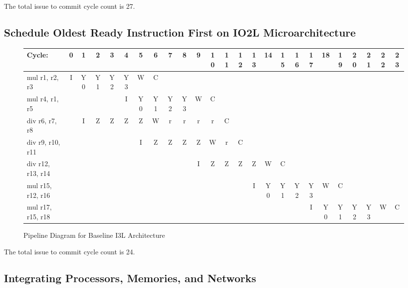 \documentclass[10pt]{article}
\begin{document}
The total issue to commit cycle count is 27.

\subsection{Schedule Oldest Ready Instruction First on IO2L Microarchitecture}

\begin{figure}[H]
\centering
{\setlength{\tabcolsep}{2pt}
\begin{tabular}{|l!{\vrule width 1.5pt}c|c|c|c|c|c|c|c|c|c|c|c|c|c|c|c|c|c|c|c|c|c|c|c!{\vrule width 1.5pt}}
\hline
Cycle:            & 0 & 1 & 2 & 3 & 4 & 5 & 6 & 7 & 8 & 9 & 10 & 11 & 12 & 13 & 14 & 15 & 16 & 17 & 18 & 19 & 20 & 21 & 22 & 23 \\ \hline
mul r1, r2, r3    & I & Y0& Y1& Y2& Y3& W & C &   &   &   &    &    &    &    &    &    &    &    &    &    &    &    &    &    \\ \hline
mul r4, r1, r5    &   &   &   &   & I & Y0& Y1& Y2& Y3& W & C  &    &    &    &    &    &    &    &    &    &    &    &    &    \\ \hline
div r6, r7, r8    &   & I & Z & Z & Z & Z & W & r & r & r & r  & C  &    &    &    &    &    &    &    &    &    &    &    &    \\ \hline
div r9, r10, r11  &   &   &   &   &   & I & Z & Z & Z & Z & W  & r  & C  &    &    &    &    &    &    &    &    &    &    &    \\ \hline
div r12, r13, r14 &   &   &   &   &   &   &   &   &   & I & Z  & Z  & Z  & Z  & W  & C  &    &    &    &    &    &    &    &    \\ \hline
mul r15, r12, r16 &   &   &   &   &   &   &   &   &   &   &    &    &    & I  & Y0 & Y1 & Y2 & Y3 & W  & C  &    &    &    &    \\ \hline
mul r17, r15, r18 &   &   &   &   &   &   &   &   &   &   &    &    &    &    &    &    &    & I  & Y0 & Y1 & Y2 & Y3 & W  & C  \\ \hline
\end{tabular}
}
\caption{Pipeline Diagram for Baseline I3L Architecture}
\end{figure}

The total issue to commit cycle count is 24.

\subsection{Integrating Processors, Memories, and Networks}
\end{document}
